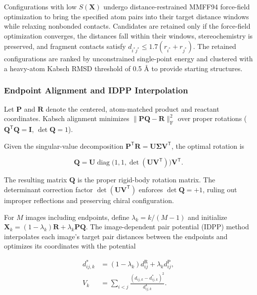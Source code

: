 Configurations with low $S(\mathbf{X})$ undergo distance-restrained MMFF94 force-field optimization\citep{mmff941996} to bring the specified atom pairs into their target distance windows while relaxing nonbonded contacts. Candidates are retained only if the force-field optimization converges, the distances fall within their windows, stereochemistry is preserved, and fragment contacts satisfy $d_{i^*j^*}\le 1.7(r_{i^*}+r_{j^*})$. The retained configurations are ranked by unconstrained single-point energy and clustered with a heavy-atom Kabsch RMSD threshold of 0.5 Å to provide starting structures.

\subsubsection{Endpoint Alignment and IDPP Interpolation}
Let $\mathbf{P}$ and $\mathbf{R}$ denote the centered, atom-matched product and reactant coordinates. Kabsch alignment\citep{ref07} minimizes $\|\mathbf{P}\mathbf{Q}-\mathbf{R}\|_{\mathrm{F}}^2$ over proper rotations (\mbox{$\mathbf{Q}^{\mathsf{T}}\mathbf{Q}=\mathbf{I}$}, \mbox{$\det\mathbf{Q}=1$}).

\begin{samepage}
Given the singular-value decomposition $\mathbf{P}^{\mathsf{T}}\mathbf{R}=\mathbf{U}\boldsymbol{\Sigma}\mathbf{V}^{\mathsf{T}}$, the optimal rotation is

\begin{equation}\label{eq:methods-07}
\mathbf{Q}=\mathbf{U}\operatorname{diag}\!\bigl(1,1,\det(\mathbf{U}\mathbf{V}^{\mathsf{T}})\bigr)\mathbf{V}^{\mathsf{T}}.
\end{equation}
\end{samepage}

The resulting matrix $\mathbf{Q}$ is the proper rigid-body rotation matrix. The determinant correction factor $\det(\mathbf{U}\mathbf{V}^{\mathsf{T}})$ enforces $\det\mathbf{Q}=+1$, ruling out improper reflections and preserving chiral configuration.

For $M$ images including endpoints, define $\lambda_k=k/(M-1)$ and initialize $\mathbf{X}_k=(1-\lambda_k)\mathbf{R}+\lambda_k\mathbf{P}\mathbf{Q}$. The image-dependent pair potential (IDPP) method \citep{ref08} interpolates each image's target pair distances between the endpoints and optimizes its coordinates with the potential

\begin{equation}\label{eq:methods-08}
\begin{aligned}
d_{ij,k}^*&=(1-\lambda_k)d_{ij}^{\mathrm{R}}+\lambda_k d_{ij}^{\mathrm{P}},\\
V_k&=\sum_{i<j}\frac{(d_{ij,k}-d_{ij,k}^*)^2}{d_{ij,k}^4}.
\end{aligned}
\end{equation}

